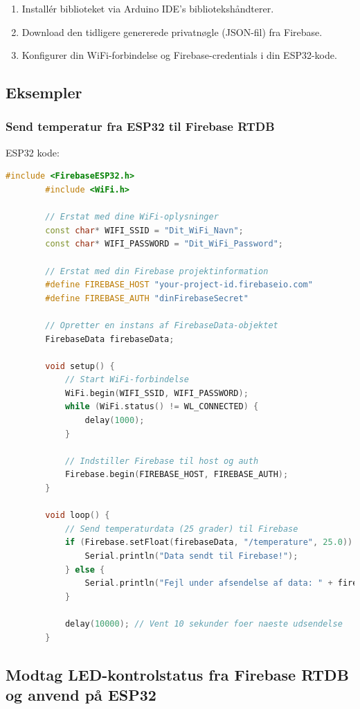 \documentclass[12pt,a4paper]{book}
\begin{document}
	\begin{enumerate}
		\item Installér biblioteket via Arduino IDE's bibliotekshåndterer.
		\item Download den tidligere genererede privatnøgle (JSON-fil) fra Firebase.
		\item Konfigurer din WiFi-forbindelse og Firebase-credentials i din ESP32-kode.
	\end{enumerate}
	
	\subsection*{Eksempler}
	
	\subsubsection*{Send temperatur fra ESP32 til Firebase RTDB}
	
	ESP32 kode:
	\begin{lstlisting}[language=C++, caption=ESP32 kode til kommunikation med Firebase RTDB]
		#include <FirebaseESP32.h>
		#include <WiFi.h>
		
		// Erstat med dine WiFi-oplysninger
		const char* WIFI_SSID = "Dit_WiFi_Navn";
		const char* WIFI_PASSWORD = "Dit_WiFi_Password";
		
		// Erstat med din Firebase projektinformation
		#define FIREBASE_HOST "your-project-id.firebaseio.com"
		#define FIREBASE_AUTH "dinFirebaseSecret"
		
		// Opretter en instans af FirebaseData-objektet
		FirebaseData firebaseData;
		
		void setup() {
			// Start WiFi-forbindelse
			WiFi.begin(WIFI_SSID, WIFI_PASSWORD);
			while (WiFi.status() != WL_CONNECTED) {
				delay(1000);
			}
			
			// Indstiller Firebase til host og auth
			Firebase.begin(FIREBASE_HOST, FIREBASE_AUTH);
		}
		
		void loop() {
			// Send temperaturdata (25 grader) til Firebase
			if (Firebase.setFloat(firebaseData, "/temperature", 25.0)) {
				Serial.println("Data sendt til Firebase!");
			} else {
				Serial.println("Fejl under afsendelse af data: " + firebaseData.errorReason());
			}
			
			delay(10000); // Vent 10 sekunder foer naeste udsendelse
		}
	\end{lstlisting}
	\clearpage
	\subsection*{Modtag LED-kontrolstatus fra Firebase RTDB og anvend på ESP32}
	
\end{document}
